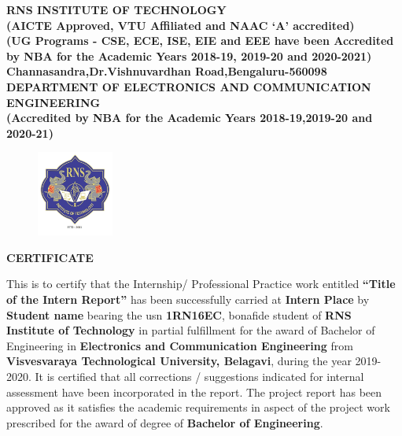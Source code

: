%
\setlength{\toptafiddle}{1in}
\setlength{\bottafiddle}{1in}
\vspace*{-0.4in}
\enlargethispage{\bottafiddle}
\thispagestyle{empty}


\begin{center}
\small\textbf{{\color{blue}	RNS INSTITUTE OF TECHNOLOGY\\
(AICTE Approved, VTU Affiliated and NAAC `A' accredited)\\
(UG Programs - CSE, ECE, ISE, EIE and EEE have been Accredited by NBA for the Academic Years 2018-19, 2019-20 and 2020-2021)\\
Channasandra,Dr.Vishnuvardhan Road,Bengaluru-560098}\\
\vspace{0.3cm}
DEPARTMENT OF ELECTRONICS AND COMMUNICATION ENGINEERING\\
(Accredited by NBA for the Academic Years 2018-19,2019-20 and 2020-21)
}
\end{center}

\begin{center}
\begin{figure}[h]
\centering
\includegraphics[height=2.8cm]{images/rns1.jpg}
\end{figure}
\Large{\textbf{CERTIFICATE}}
\end{center}

This is to certify that the Internship/ Professional Practice work entitled \textbf{``Title of the Intern Report''} has been successfully carried at \textbf{Intern Place} by \textbf{Student name} bearing the usn \textbf{1RN16EC}, bonafide student of \textbf{\color{blue}RNS Institute of Technology} in partial fulfillment for the award of Bachelor of Engineering in \textbf{\color{blue}Electronics and Communication Engineering} from \textbf{\color{blue}Visvesvaraya Technological University, Belagavi}, during the year 2019-2020. It is certified that all corrections / suggestions indicated for internal assessment have been incorporated in the report. The project report has been approved as it satisfies the academic requirements in aspect of the project work prescribed for the award of degree of \textbf{\color{blue}Bachelor of Engineering}.

